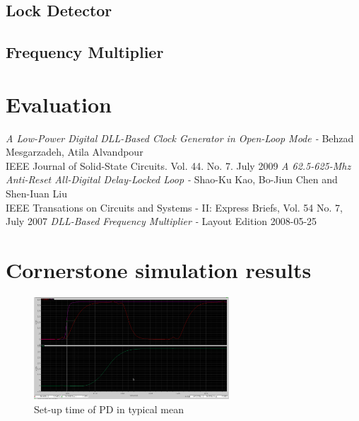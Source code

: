 \documentclass[a4paper,12pt]{article} \usepackage{graphicx}
\begin{document}
\subsection{Lock Detector}
\subsection{Frequency Multiplier}

\section{Evaluation}

\newpage
\appendix 
\newpage

\begin{thebibliography}{99}
        \textit{A Low-Power Digital DLL-Based Clock Generator in Open-Loop Mode - }
                Behzad Mesgarzadeh, Atila Alvandpour \\
                IEEE Journal of Solid-State Circuits. Vol. 44. No. 7. July 2009
        \textit{A 62.5-625-Mhz Anti-Reset All-Digital Delay-Locked Loop - }
                Shao-Ku Kao, Bo-Jiun Chen and Shen-Iuan Liu \\
                IEEE Transations on Circuits and Systems - II: Express Briefs, Vol. 54 No. 7, July 2007
        \textit{DLL-Based Frequency Multiplier - }
                Layout Edition 2008-05-25 

\end{thebibliography}

\newpage
\section{Cornerstone simulation results}
\label{sec:corners}

\begin{figure}[h]
  \centering
  \includegraphics[width=0.65\textwidth]{../Bilder/Layout/pd_tm.png}
  \caption{Set-up time of PD in typical mean}
  \label{fig:PDtm}
\end{figure}
\end{document}
